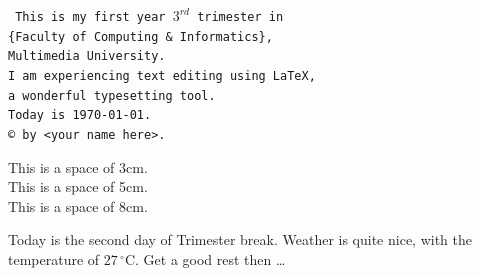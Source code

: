 \documentclass[a4paper,10pt]{article}
\begin{document}
\noindent
\texttt{\large
This is my first year $3^{rd}$ trimester in \\
\{Faculty of Computing \&\ Informatics\}, \\
Multimedia University. \\
I am experiencing text editing using \LaTeX ,\\
a wonderful typesetting tool.\\
Today is \today. \\
\copyright\ by \textless your name here\textgreater.}

This \hspace{3cm} is a space of 3cm. \\
This \hspace{5cm} is a space of 5cm. \\
This \hspace{8cm} is a space of 8cm.

Today is the second day of Trimester break.
Weather is quite nice,
with the temperature of $27\,^{\circ}\mathrm{C}$.
Get a good rest then \ldots

\textemdash

\textendash
\end{document}
